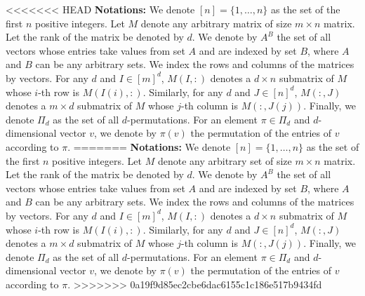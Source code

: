 
\newcommand{\transpose}{^\mathsf{\scriptscriptstyle T}}
<<<<<<< HEAD
\textbf{Notations:} We denote $[n] = \{1, \dots, n\}$ as the set of the first $n$ positive integers. Let $M$ denote any arbitrary matrix of size $m \times n$ matrix. Let the rank of the matrix be denoted by $d$. We denote by $A^B$ the set of all vectors whose entries take values from set $A$ and are indexed by set $B$, where $A$ and $B$ can be any arbitrary sets. We index the rows and columns of the matrices by vectors. For any $d$ and $I \in [m]^d$, $M(I, :)$ denotes a $d \times n$ submatrix of $M$ whose $i$-th row is $M(I(i), :)$. Similarly, for any $d$ and $J \in [n]^d$, $M(:, J)$ denotes a $m \times d$ submatrix of $M$ whose $j$-th column is $M(:, J(j))$. Finally, we denote $\Pi_d$ as the set of all $d$-permutations. For an element $\pi \in \Pi_d$ and $d$-dimensional vector $v$, we denote by $\pi(v)$ the permutation of the entries of $v$ according to $\pi$.
=======
\textbf{Notations:} We denote $[n] = \{1, \dots, n\}$ as the set of the first $n$ positive integers. Let $M$ denote any arbitrary set of size $m \times n$ matrix.  Let the rank of the matrix be denoted by $d$. We denote by $A^B$ the set of all vectors whose entries take values from set $A$ and are indexed by set $B$, where $A$ and $B$ can be any arbitrary sets. We index the rows and columns  of the matrices by vectors. For any $d$ and $I \in [m]^d$, $M(I, :)$ denotes a $d \times n$ submatrix of $M$ whose $i$-th row is $M(I(i), :)$. Similarly, for any $d$ and $J \in [n]^d$, $M(:, J)$ denotes a $m \times d$ submatrix of $M$ whose $j$-th column is $M(:, J(j))$. Finally, we denote $\Pi_d$ as the set of all $d$-permutations. For an element $\pi \in \Pi_d$ and $d$-dimensional vector $v$, we denote by $\pi(v)$ the permutation of the entries of $v$ according to $\pi$.
>>>>>>> 0a19f9d85ec2cbe6dac6155c1c186e517b9434fd

